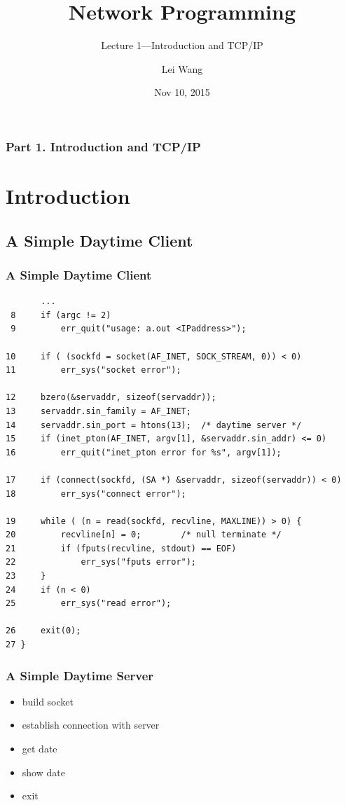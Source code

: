 \documentclass[notes,serif]{beamer}
\title{Network Programming}
\subtitle{Lecture 1---Introduction and TCP/IP}
\author{Lei Wang}
\institute{Dalian University of Technology}
\date{Nov 10, 2015}
\begin{document}
\begin{frame}
  \titlepage
\end{frame}

\begin{frame}
  \frametitle{Part 1. Introduction and TCP/IP}
  \tableofcontents
\end{frame}

\section{Introduction}
\subsection{A Simple Daytime Client}

\begin{frame}[containsverbatim]
\frametitle{A Simple Daytime Client}

{\tiny
  \begin{verbatim}
       ...
 8     if (argc != 2)
 9         err_quit("usage: a.out <IPaddress>");

10     if ( (sockfd = socket(AF_INET, SOCK_STREAM, 0)) < 0)
11         err_sys("socket error");

12     bzero(&servaddr, sizeof(servaddr));
13     servaddr.sin_family = AF_INET;
14     servaddr.sin_port = htons(13);  /* daytime server */
15     if (inet_pton(AF_INET, argv[1], &servaddr.sin_addr) <= 0)
16         err_quit("inet_pton error for %s", argv[1]);

17     if (connect(sockfd, (SA *) &servaddr, sizeof(servaddr)) < 0)
18         err_sys("connect error");

19     while ( (n = read(sockfd, recvline, MAXLINE)) > 0) {
20         recvline[n] = 0;        /* null terminate */
21         if (fputs(recvline, stdout) == EOF)
22             err_sys("fputs error");
23     }
24     if (n < 0)
25         err_sys("read error");

26     exit(0);
27 }
  \end{verbatim}
  }
\end{frame}

\begin{frame}[containsverbatim]
\frametitle{A Simple Daytime Server}
\begin{itemize}
\item build socket
\item establish connection with server
\item get date
\item show date
\item exit
\end{itemize}
\end{frame}
\end{document}

